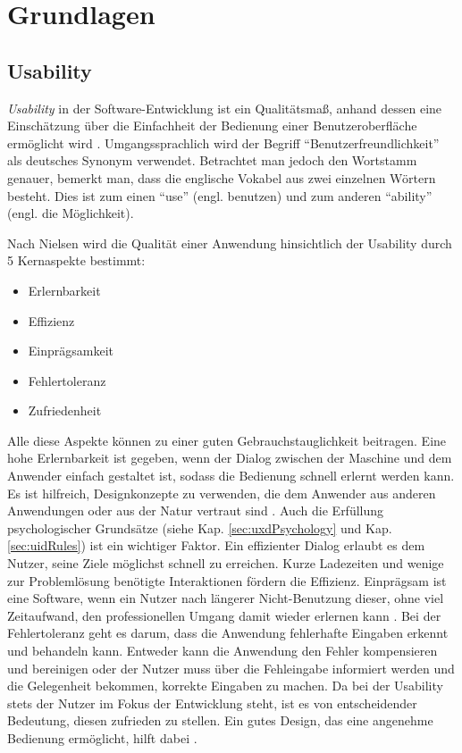 \chapter{Grundlagen}
\section{Usability}
\textit{Usability} in der Software-Entwicklung ist ein Qualitätsmaß, anhand dessen eine Einschätzung über die Einfachheit der Bedienung einer Benutzeroberfläche ermöglicht wird \cite{Nielsen2012}. Umgangssprachlich wird der Begriff \enquote{Benutzerfreundlichkeit} als deutsches Synonym verwendet. Betrachtet man jedoch den Wortstamm genauer, bemerkt man, dass die englische Vokabel aus zwei einzelnen Wörtern besteht. Dies ist zum einen \enquote{use} (engl. benutzen) und zum anderen \enquote{ability} (engl. die Möglichkeit). 

Nach Nielsen wird die Qualität einer Anwendung hinsichtlich der Usability durch 5 Kernaspekte bestimmt:
\begin{itemize}
	\item Erlernbarkeit
	\item Effizienz
	\item Einprägsamkeit
	\item Fehlertoleranz
	\item Zufriedenheit \cite{Nielsen2012}
\end{itemize}
Alle diese Aspekte können zu einer guten Gebrauchstauglichkeit beitragen. Eine hohe Erlernbarkeit ist gegeben, wenn der Dialog zwischen der Maschine und dem Anwender einfach gestaltet ist, sodass die Bedienung schnell erlernt werden kann. Es ist hilfreich, Designkonzepte zu verwenden, die dem Anwender aus anderen Anwendungen oder aus der Natur vertraut sind \cite[Learnability]{UsabilityFirstGlossary}. Auch die Erfüllung psychologischer Grundsätze (siehe Kap. \ref{sec:uxdPsychology} und Kap. \ref{sec:uidRules}) ist ein wichtiger Faktor. Ein effizienter Dialog erlaubt es dem Nutzer, seine Ziele möglichst schnell zu erreichen. Kurze Ladezeiten und wenige zur Problemlösung benötigte Interaktionen fördern die Effizienz. Einprägsam ist eine Software, wenn ein Nutzer nach längerer Nicht-Benutzung dieser, ohne viel Zeitaufwand, den professionellen Umgang damit wieder erlernen kann \cite{Nielsen2012}. Bei der Fehlertoleranz geht es darum, dass die Anwendung fehlerhafte Eingaben erkennt und behandeln kann. Entweder kann die Anwendung den Fehler kompensieren und bereinigen oder der Nutzer muss über die Fehleingabe informiert werden und die Gelegenheit bekommen, korrekte Eingaben zu machen. Da bei der Usability stets der Nutzer im Fokus der Entwicklung steht, ist es von entscheidender Bedeutung, diesen zufrieden zu stellen. Ein gutes Design, das eine angenehme Bedienung ermöglicht, hilft dabei \cite{Nielsen2012}. \par


